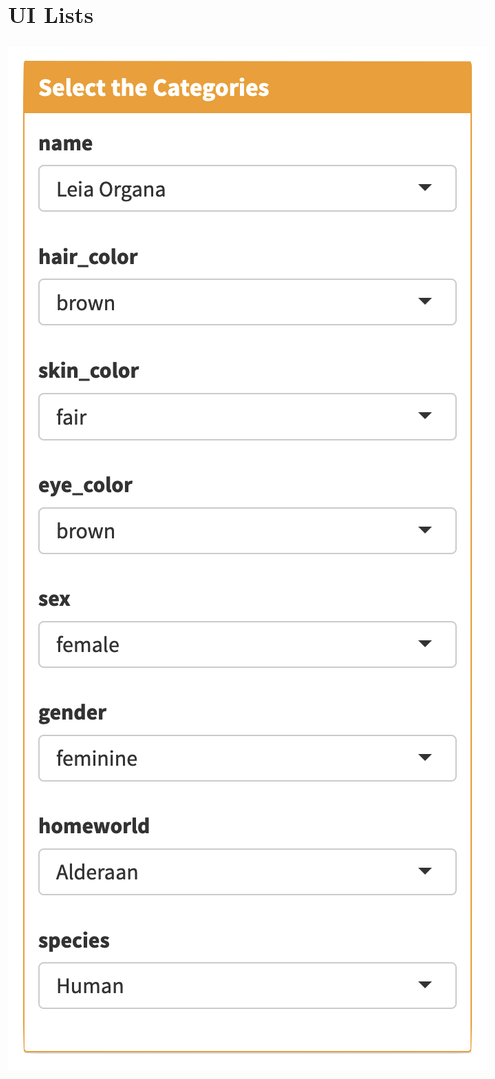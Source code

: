 \documentclass[
]{book}
\begin{document}
\hypertarget{ui-lists}{%
\subsection{UI Lists}\label{ui-lists}}

\includegraphics{images/structure_ui.png}
\end{document}
